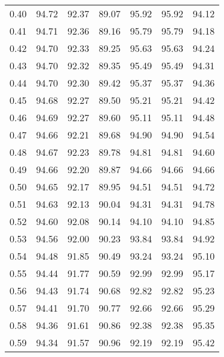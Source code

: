 \begin{tabular}{|c|c|c|c|c|c|c|}
      0.40 &     94.72 &     92.37 &      89.07 &   95.92 &      95.92 &         94.12 \\
      0.41 &     94.71 &     92.36 &      89.16 &   95.79 &      95.79 &         94.18 \\
      0.42 &     94.70 &     92.33 &      89.25 &   95.63 &      95.63 &         94.24 \\
      0.43 &     94.70 &     92.32 &      89.35 &   95.49 &      95.49 &         94.31 \\
      0.44 &     94.70 &     92.30 &      89.42 &   95.37 &      95.37 &         94.36 \\
      0.45 &     94.68 &     92.27 &      89.50 &   95.21 &      95.21 &         94.42 \\
      0.46 &     94.69 &     92.27 &      89.60 &   95.11 &      95.11 &         94.48 \\
      0.47 &     94.66 &     92.21 &      89.68 &   94.90 &      94.90 &         94.54 \\
      0.48 &     94.67 &     92.23 &      89.78 &   94.81 &      94.81 &         94.60 \\
      0.49 &     94.66 &     92.20 &      89.87 &   94.66 &      94.66 &         94.66 \\
      0.50 &     94.65 &     92.17 &      89.95 &   94.51 &      94.51 &         94.72 \\
      0.51 &     94.63 &     92.13 &      90.04 &   94.31 &      94.31 &         94.78 \\
      0.52 &     94.60 &     92.08 &      90.14 &   94.10 &      94.10 &         94.85 \\
      0.53 &     94.56 &     92.00 &      90.23 &   93.84 &      93.84 &         94.92 \\
      0.54 &     94.48 &     91.85 &      90.49 &   93.24 &      93.24 &         95.10 \\
      0.55 &     94.44 &     91.77 &      90.59 &   92.99 &      92.99 &         95.17 \\
      0.56 &     94.43 &     91.74 &      90.68 &   92.82 &      92.82 &         95.23 \\
      0.57 &     94.41 &     91.70 &      90.77 &   92.66 &      92.66 &         95.29 \\
      0.58 &     94.36 &     91.61 &      90.86 &   92.38 &      92.38 &         95.35 \\
      0.59 &     94.34 &     91.57 &      90.96 &   92.19 &      92.19 &         95.42 \\

\end{tabular}
